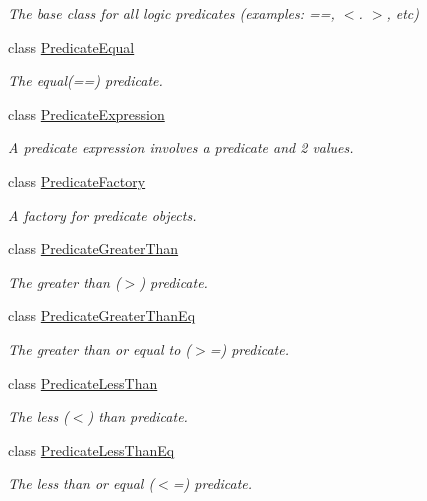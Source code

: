 \begin{DoxyCompactItemize}
\begin{DoxyCompactList}\small\item\em The base class for all logic predicates (examples\-: ==, $<$. $>$, etc) \end{DoxyCompactList}\item 
class \hyperlink{class_picto_1_1_predicate_equal}{Predicate\-Equal}
\begin{DoxyCompactList}\small\item\em The equal(==) predicate. \end{DoxyCompactList}\item 
class \hyperlink{class_picto_1_1_predicate_expression}{Predicate\-Expression}
\begin{DoxyCompactList}\small\item\em A predicate expression involves a predicate and 2 values. \end{DoxyCompactList}\item 
class \hyperlink{class_picto_1_1_predicate_factory}{Predicate\-Factory}
\begin{DoxyCompactList}\small\item\em A factory for predicate objects. \end{DoxyCompactList}\item 
class \hyperlink{class_picto_1_1_predicate_greater_than}{Predicate\-Greater\-Than}
\begin{DoxyCompactList}\small\item\em The greater than ($>$) predicate. \end{DoxyCompactList}\item 
class \hyperlink{class_picto_1_1_predicate_greater_than_eq}{Predicate\-Greater\-Than\-Eq}
\begin{DoxyCompactList}\small\item\em The greater than or equal to ($>$=) predicate. \end{DoxyCompactList}\item 
class \hyperlink{class_picto_1_1_predicate_less_than}{Predicate\-Less\-Than}
\begin{DoxyCompactList}\small\item\em The less ($<$) than predicate. \end{DoxyCompactList}\item 
class \hyperlink{class_picto_1_1_predicate_less_than_eq}{Predicate\-Less\-Than\-Eq}
\begin{DoxyCompactList}\small\item\em The less than or equal ($<$=) predicate. \end{DoxyCompactList}\item 

\end{DoxyCompactItemize}
